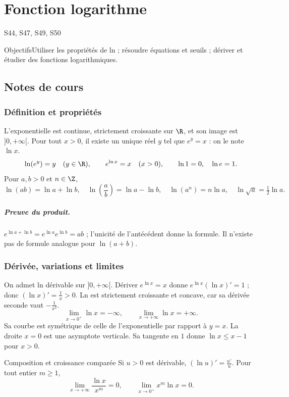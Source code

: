 \setcounter{chapter}{5}\chapter{Fonction logarithme}\label{ch:6}

{\small\sffamily\color{teal}S44, S47, S49, S50\par}

\begin{retenir}{Objectifs}Utiliser les propriétés de ln ; résoudre équations et seuils ; dériver et étudier des fonctions logarithmiques.\end{retenir}

\section{Notes de cours}
\subsection{Définition et propriétés}
L'exponentielle est continue, strictement croissante sur $\R$, et son image est $]0,+\infty[$. Pour tout $x>0$, il existe un unique réel $y$ tel que $e^y=x$ : on le note $\ln x$.
\[\ln(e^y)=y\quad(y\in\R),\qquad e^{\ln x}=x\quad(x>0),\qquad\ln1=0,\quad\ln e=1.\]
Pour $a,b>0$ et $n\in\Z$,
\[\ln (ab)=\ln a+\ln b,\quad\ln (\frac{a}{b})=\ln a-\ln b,\quad\ln (a^n)=n\ln a,\quad\ln \sqrt{a}=\tfrac{1}{2}\ln a.\]
\paragraph{Preuve du produit.} $e^{\ln a+\ln b}=e^{\ln a}e^{\ln b}=ab$ ; l'unicité de l'antécédent donne la formule. Il n'existe pas de formule analogue pour $\ln(a+b)$.
\subsection{Dérivée, variations et limites}
On admet ln dérivable sur $]0,+\infty[$. Dériver $e^{\ln x}=x$ donne $e^{\ln x}(\ln x)'=1$ ; donc $(\ln x)'=\frac{1}{x}>0$. Ln est strictement croissante et concave, car sa dérivée seconde vaut $-\frac{1}{x^2}$.
\[\lim_{x\to0^+}\ln x=-\infty,\qquad\lim_{x\to+\infty}\ln x=+\infty.\]
Sa courbe est symétrique de celle de l'exponentielle par rapport à $y=x$. La droite $x=0$ est une asymptote verticale. Sa tangente en $1$ donne $\ln x\le x-1$ pour $x>0$.
\begin{retenir}{Composition et croissance comparée}
Si $u>0$ est dérivable, $(\ln u)'=\frac{u'}{u}$. Pour tout entier $m\ge1$,
\[\lim_{x\to+\infty}\frac{\ln x}{x^m}=0,\qquad\lim_{x\to0^+}x^m\ln x=0.\]
\end{retenir}
